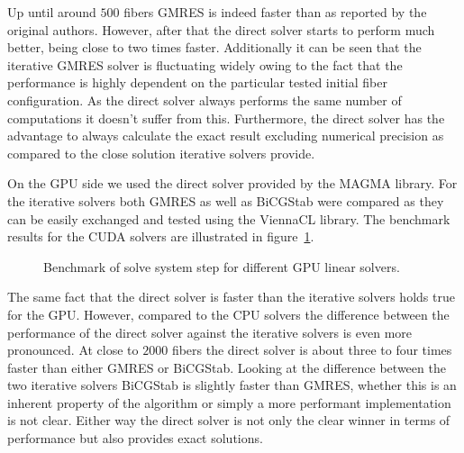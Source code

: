 \documentclass[a4paper,11pt]{kth-mag}
\begin{document}
Up until around $500$ fibers GMRES is indeed faster than as reported by the original authors. However, after that the direct solver starts to perform much better, being close to two times faster. Additionally it can be seen that the iterative GMRES solver is fluctuating widely owing to the fact that the performance is highly dependent on the particular tested initial fiber configuration. As the direct solver always performs the same number of computations it doesn't suffer from this. Furthermore, the direct solver has the advantage to always calculate the exact result excluding numerical precision as compared to the close solution iterative solvers provide.

On the GPU side we used the direct solver provided by the MAGMA library. For the iterative solvers both GMRES as well as BiCGStab were compared as they can be easily exchanged and tested using the ViennaCL library. The benchmark results for the CUDA solvers are illustrated in figure~\ref{fig:bench_cuda_solvers}.

\begin{figure}
  \centering
  \caption{Benchmark of solve system step for different GPU linear solvers.}
  \label{fig:bench_cuda_solvers}
\end{figure}

The same fact that the direct solver is faster than the iterative solvers holds true for the GPU. However, compared to the CPU solvers the difference between the performance of the direct solver against the iterative solvers is even more pronounced. At close to $2000$ fibers the direct solver is about three to four times faster than either GMRES or BiCGStab. Looking at the difference between the two iterative solvers BiCGStab is slightly faster than GMRES, whether this is an inherent property of the algorithm or simply a more performant implementation is not clear. Either way the direct solver is not only the clear winner in terms of performance but also provides exact solutions.
\end{document}
